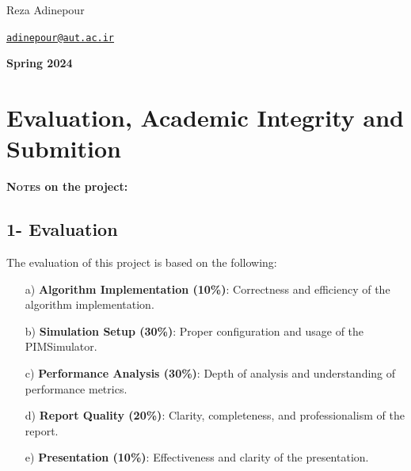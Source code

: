 \documentclass[12pt]{article}
\begin{document}
\begin{center}
    \begin{minipage}{0.5\textwidth}
        \begin{flushleft}
            Reza Adinepour\\
        \end{flushleft}
    \end{minipage}%
    \begin{minipage}{0.5\textwidth}
        \begin{flushright}
            \href{mailto:adinepour@aut.ac.ir}{\texttt{adinepour@aut.ac.ir}}
        \end{flushright}
    \end{minipage}
\end{center}

\vspace{1em}

    
\begin{center}
    \bigskip \bigskip \bigskip \bigskip
    \large \bf {}\selectfont Spring 2024
\end{center}

\thispagestyle{empty}

\setcounter{page}{0}

\newpage
\section*{Evaluation, Academic Integrity and Submition}
\textbf{\textsc{Notes} on the project:}
\subsection*{1- Evaluation}
The evaluation of this project is based on the following:

\begin{enumerate}
	\item[a)] \textbf{Algorithm Implementation (10\%)}: Correctness and efficiency of the algorithm implementation.
	\item[b)] \textbf{Simulation Setup (30\%)}: Proper configuration and usage of the PIMSimulator.
	\item[c)] \textbf{Performance Analysis (30\%)}: Depth of analysis and understanding of performance metrics.
	\item[d)] \textbf{Report Quality (20\%)}: Clarity, completeness, and professionalism of the report.
	\item[e)] \textbf{Presentation (10\%)}: Effectiveness and clarity of the presentation.
\end{enumerate}
\end{document}
